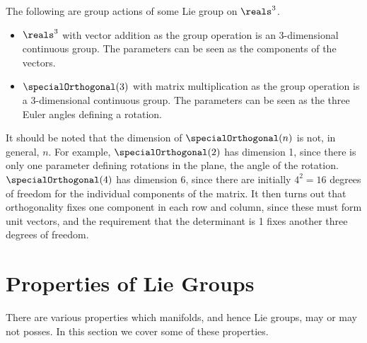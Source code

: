 \begin{exm}{}{}
    The following are group actions of some Lie group on \(\reals^3\).
    \begin{itemize}
        \item \(\reals^3\) with vector addition as the group operation is an \(3\)-dimensional continuous group.
        The parameters can be seen as the components of the vectors.
        
        \item \(\specialOrthogonal(3)\) with matrix multiplication as the group operation is a \(3\)-dimensional continuous group.
        The parameters can be seen as the three Euler angles defining a rotation.
    \end{itemize}
\end{exm}

It should be noted that the dimension of \(\specialOrthogonal(n)\) is not, in general, \(n\).
For example, \(\specialOrthogonal(2)\) has dimension 1, since there is only one parameter defining rotations in the plane, the angle of the rotation.
\(\specialOrthogonal(4)\) has dimension 6, since there are initially \(4^2 = 16\) degrees of freedom for the individual components of the matrix.
It then turns out that orthogonality fixes one component in each row and column, since these must form unit vectors, and the requirement that the determinant is 1 fixes another three degrees of freedom.

\section{Properties of Lie Groups}
There are various properties which manifolds, and hence Lie groups, may or may not posses.
In this section we cover some of these properties.

